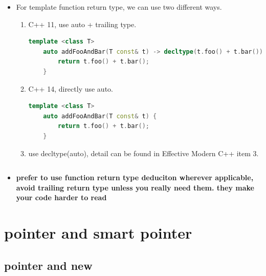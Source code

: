\documentclass[a4paper,12pt,twoside]{book}
\begin{document}
\begin{itemize}
\item For template function return type, we can use two different ways.
\begin{enumerate}
	\item C++ 11, use auto + trailing type.
		\begin{lstlisting}[frame=single, language=c++]
	template <class T>
	auto addFooAndBar(T const& t) -> decltype(t.foo() + t.bar()) {
		return t.foo() + t.bar();
	}
		\end{lstlisting}
	\item C++ 14, directly use auto.
	\begin{lstlisting}[frame=single, language=c++]
	template <class T>
	auto addFooAndBar(T const& t) {
		return t.foo() + t.bar();
	}
	\end{lstlisting}
	\item use decltype(auto), detail can be found in Effective Modern C++ item 3.
	\begin{lstlisting}[frame=single, language=c++]

	\end{lstlisting}
\end{enumerate}
	
	\item \textbf{prefer to use function return type deduciton wherever applicable, avoid trailing return type unless you really need them. they make your code harder to read}
\end{itemize}


\chapter{pointer and smart pointer}

\section{pointer and new}
\end{document}
